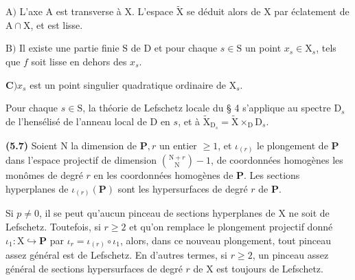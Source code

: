 \documentclass[10pt,leqno]{article}
\begin{document}
\noindent \(\mathrm{A})\) L’axe \(\mathrm{A}\) est transverse à \(\mathrm{X}\). L’espace \(\widetilde{\mathrm{X}}\) se déduit alors de \(\mathrm{X}\) par éclatement de \(\mathrm{A}\cap \mathrm{X}\), et est lisse.\par

\clearpage

\label{physical-21}\par\smallskip

\noindent \(\mathrm{B})\) Il existe une partie finie \(\mathrm{S}\) de \(\mathrm{D}\) et pour chaque \(s\in \mathrm{S}\) un point \(x_{s}\in \mathrm{X}_{s}\), tels que \(f\) soit lisse en dehors des \(x_{s}\).\par

\noindent \(\mathbf{C}) x_{s}\) est un point singulier quadratique ordinaire de \(\mathrm{X}_{s}\).\par

\noindent Pour chaque \(s\in \mathrm{S}\), la théorie de Lefschetz locale du § 4 s’applique au spectre \(\mathrm{D}_{s}\) de l’hensélisé de l’anneau local de \(\mathrm{D}\) en \(s\), et à \(\widetilde{\mathrm{X}}_{\mathrm{D}_{s}}=\widetilde{\mathrm{X}}\times _{\mathrm{D}} \mathrm{D}_{s}\).\par

\noindent \textbf{(5.7)} Soient \(\mathrm{N}\) la dimension de \(\mathbf{P}, r\) un entier \(\geq 1\), et \(\iota _{(r)}\) le plongement de \(\mathbf{P}\) dans l’espace projectif de dimension \(\binom{\mathrm{N}+r}{\mathrm{N}}- 1\), de coordonnées homogènes les monômes de degré \(r\) en les coordonnées homogènes de \(\mathbf{P}\). Les sections hyperplanes de \(\iota _{(r)}(\mathbf{P})\) sont les hypersurfaces de degré \(r\) de \(\mathbf{P}\).\par

\noindent Si \(p\ne 0\), il se peut qu’aucun pinceau de sections hyperplanes de \(\mathrm{X}\) ne soit de Lefschetz. Toutefois, si \(r\geq 2\) et qu’on remplace le plongement projectif donné \(\iota _{1}:\mathrm{X}\hookrightarrow \mathbf{P}\) par \(\iota _{r}=\iota _{(r)}\circ \iota _{1}\), alors, dans ce nouveau plongement, tout pinceau assez général est de Lefschetz. En d’autres termes, si \(r\geq 2\), un pinceau assez général de sections hypersurfaces de degré \(r\) de \(\mathrm{X}\) est toujours de Lefschetz.\par
\end{document}
